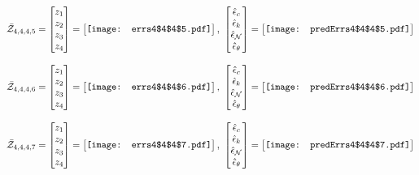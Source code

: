 \documentclass[12pt]{article}
\begin{document}
\begin{gather*}
\bar{\mathcal{Z}}_{4,4,4,5}=\begin{bmatrix}
z_1\\
z_2\\
z_3\\
z_4
 \end{bmatrix}= \begin{bmatrix}
\vcenter{\hbox{\texttt{[image: errs4\$4\$4\$5.pdf]}}}
 \end{bmatrix},\,\, \begin{bmatrix}
\hat{\epsilon}_c\\\hat{\epsilon}_k\\\hat{\epsilon}_\mathcal{N}\\\hat{\epsilon}_\theta
 \end{bmatrix}=\begin{bmatrix}
\vcenter{\hbox{\texttt{[image: predErrs4\$4\$4\$5.pdf]}}}
 \end{bmatrix}
\end{gather*}


\begin{gather*}
\bar{\mathcal{Z}}_{4,4,4,6}=\begin{bmatrix}
z_1\\
z_2\\
z_3\\
z_4
 \end{bmatrix}= \begin{bmatrix}
\vcenter{\hbox{\texttt{[image: errs4\$4\$4\$6.pdf]}}}
 \end{bmatrix},\,\, \begin{bmatrix}
\hat{\epsilon}_c\\\hat{\epsilon}_k\\\hat{\epsilon}_\mathcal{N}\\\hat{\epsilon}_\theta
 \end{bmatrix}=\begin{bmatrix}
\vcenter{\hbox{\texttt{[image: predErrs4\$4\$4\$6.pdf]}}}
 \end{bmatrix}
\end{gather*}


\begin{gather*}
\bar{\mathcal{Z}}_{4,4,4,7}=\begin{bmatrix}
z_1\\
z_2\\
z_3\\
z_4
 \end{bmatrix}= \begin{bmatrix}
\vcenter{\hbox{\texttt{[image: errs4\$4\$4\$7.pdf]}}}
 \end{bmatrix},\,\, \begin{bmatrix}
\hat{\epsilon}_c\\\hat{\epsilon}_k\\\hat{\epsilon}_\mathcal{N}\\\hat{\epsilon}_\theta
 \end{bmatrix}=\begin{bmatrix}
\vcenter{\hbox{\texttt{[image: predErrs4\$4\$4\$7.pdf]}}}
 \end{bmatrix}
\end{gather*}
\end{document}
